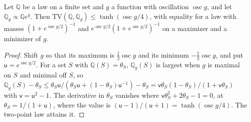 \begin{lemma}[Tilts]\label{lem:agy-tilt}
Let $\mathbb Q$ be a law on a finite set and $g$ a function with oscillation $\operatorname{osc}g$, and let $\mathbb Q_g\propto\mathbb Qe^g$. Then $\mathrm{TV}(\mathbb Q,\mathbb Q_g)\le\tanh(\operatorname{osc}g/4)$, with equality for a law with masses $(1+e^{\operatorname{osc}g/2})^{-1}$ and $e^{\operatorname{osc}g/2}(1+e^{\operatorname{osc}g/2})^{-1}$ on a maximizer and a minimizer of $g$.
\end{lemma}

\begin{proof}
Shift $g$ so that its maximum is $\frac12\operatorname{osc}g$ and its minimum $-\frac12\operatorname{osc}g$, and put $\mathsf u=e^{\operatorname{osc}g/2}$. For a set $S$ with $\mathbb Q(S)=\theta_S$, $\mathbb Q_g(S)$ is largest when $g$ is maximal on $S$ and minimal off $S$, so $\mathbb Q_g(S)-\theta_S\le\theta_S\mathsf u/(\theta_S\mathsf u+(1-\theta_S)\mathsf u^{-1})-\theta_S=\mathsf v\theta_S(1-\theta_S)/(1+\mathsf v\theta_S)$ with $\mathsf v=\mathsf u^2-1$. The derivative in $\theta_S$ vanishes where $\mathsf v\theta_S^2+2\theta_S-1=0$, at $\theta_S=1/(1+\mathsf u)$, where the value is $(\mathsf u-1)/(\mathsf u+1)=\tanh(\operatorname{osc}g/4)$. The two-point law attains it.
\end{proof}

